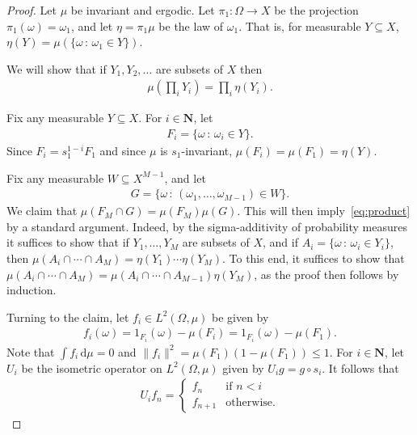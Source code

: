 \documentclass[12pt, pdflatex]{amsart}
\theoremstyle{definition}
\numberwithin{equation}{section}
\numberwithin{theorem}{section}
\newcommand{\NN}{\mathbf{N}}
\def\dd{\mathrm{d}}
\begin{document}
\begin{proof}
    Let $\mu$ be invariant and ergodic. Let $\pi_1 \colon \Omega \to X$ be the projection $\pi_1(\omega)=\omega_1$, and let $\eta = \pi_1\mu$ be the law of $\omega_1$. That is, for measurable $Y \subseteq X$, $\eta(Y) = \mu(\{\omega\,:\, \omega_1 \in Y\})$. 
    
    We will show that if $Y_1,Y_2,\ldots$ are subsets of $X$ then 
    \begin{align}
        \label{eq:product}
        \mu\left(\prod_i Y_i\right) = \prod_i \eta(Y_i).
    \end{align}

    Fix any measurable $Y \subseteq X$. For $i \in \NN$, let
    \begin{align*}
      F_i = \{\omega \,:\, \omega_i \in Y\}.
    \end{align*}
    Since $F_i = s_1^{1-i}F_1$ and since $\mu$ is $s_1$-invariant, $\mu(F_i) = \mu(F_1) = \eta(Y)$.

    Fix any measurable $W \subseteq X^{M-1}$, and let
    \begin{align*}
      G = \{\omega\,:\, (\omega_1,\ldots,\omega_{M-1}) \in W\}.
    \end{align*}
    We claim that $\mu(F_M \cap G) = \mu(F_M) \mu(G)$. This will then imply~\eqref{eq:product} by a standard argument. Indeed, by the sigma-additivity of probability measures it suffices to show that if $Y_1,\ldots,Y_M$ are subsets of $X$, and if $A_i = \{\omega\,:\,\omega_i \in Y_i\}$, then $\mu(A_i\cap \cdots \cap A_M) = \eta(Y_1)\cdots\eta(Y_M)$. To this end, it suffices to show that $\mu(A_i\cap \cdots \cap A_M) = \mu(A_i\cap \cdots \cap A_{M-1})\eta(Y_M)$, as the proof then follows by induction.

Turning to the claim, let $f_i \in L^2(\Omega,\mu)$ be given by
    \begin{align*}
      f_i(\omega) = 1_{F_i}(\omega)-\mu(F_i) = 1_{F_i}(\omega)-\mu(F_1).
    \end{align*}
    Note that $\int f_i\,\dd\mu = 0$ and $\| f_i \|^2 =  \mu(F_1)(1-\mu(F_1)) \leq 1$. For $i\in \NN$, let $U_i$ be the isometric operator on $L^2(\Omega,\mu)$ given by $U_ig = g \circ s_i$. It follows that
    \begin{align*}
      U_i f_n =
      \begin{cases}
        f_n&\text{if } n < i\\
        f_{n+1}&\text{otherwise.}
      \end{cases}
    \end{align*}


\end{proof}
\end{document}
